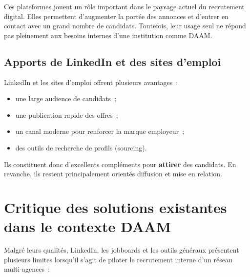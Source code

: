 Ces plateformes jouent un rôle important dans le paysage actuel du recrutement
digital. Elles permettent d'augmenter la portée des annonces et d'entrer en
contact avec un grand nombre de candidats. Toutefois, leur usage seul ne
répond pas pleinement aux besoins internes d'une institution comme DAAM.


\subsection{Apports de LinkedIn et des sites d'emploi}

LinkedIn et les sites d'emploi offrent plusieurs avantages~:
\begin{itemize}
  \item une large audience de candidats~;
  \item une publication rapide des offres~;
  \item un canal moderne pour renforcer la marque employeur~;
  \item des outils de recherche de profils (sourcing).
\end{itemize}

Ils constituent donc d'excellents compléments pour \textbf{attirer} des
candidats. En revanche, ils restent principalement orientés diffusion et
mise en relation.


\section{Critique des solutions existantes dans le contexte DAAM}

Malgré leurs qualités, LinkedIn, les jobboards et les outils généraux
présentent plusieurs limites lorsqu'il s'agit de piloter le recrutement
interne d'un réseau multi-agences~:

